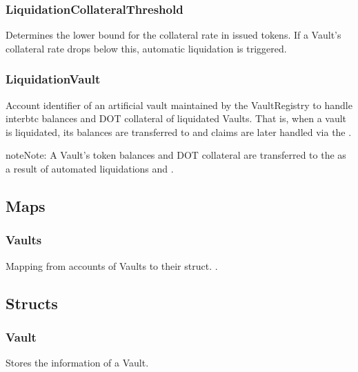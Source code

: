 \documentclass[a4paper,10pt,english]{sphinxmanual}
\begin{document}
\subsubsection{LiquidationCollateralThreshold}
\label{\detokenize{spec/vault-registry:liquidationcollateralthreshold}}\label{\detokenize{spec/vault-registry:id3}}
Determines the lower bound for the collateral rate in issued tokens. If a Vault’s collateral rate drops below this, automatic liquidation is triggered.


\subsubsection{LiquidationVault}
\label{\detokenize{spec/vault-registry:liquidationvault}}
Account identifier of an artificial vault maintained by the VaultRegistry to handle interbtc balances and DOT collateral of liquidated Vaults. That is, when a vault is liquidated, its balances are transferred to  and claims are later handled via the .

\begin{sphinxadmonition}{note}{Note:}
A Vault’s token balances and DOT collateral are transferred to the  as a result of automated liquidations and {\hyperref[\detokenize{spec/staked-relayers:reportvaulttheft}]{}}.
\end{sphinxadmonition}


\subsection{Maps}
\label{\detokenize{spec/vault-registry:maps}}

\subsubsection{Vaults}
\label{\detokenize{spec/vault-registry:vaults}}
Mapping from accounts of Vaults to their struct. .


\subsection{Structs}
\label{\detokenize{spec/vault-registry:structs}}

\subsubsection{Vault}
\label{\detokenize{spec/vault-registry:vault}}
Stores the information of a Vault.
\end{document}
